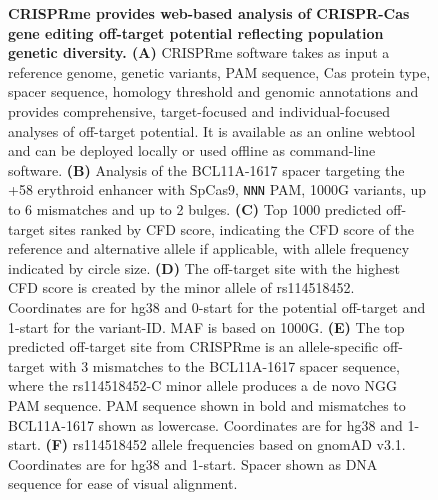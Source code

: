 \documentclass[a4paper, titlepage, openright]{book}
\begin{document}
\begin{figure}
	\caption[CRISPRme provides web-based analysis of CRISPR-Cas gene editing off-target potential reflecting population genetic diversity]{\textbf{CRISPRme provides web-based analysis of CRISPR-Cas gene editing off-target potential reflecting population genetic diversity. (A)} CRISPRme software takes as input a reference genome, genetic variants, PAM sequence, Cas protein type, spacer sequence, homology threshold and genomic annotations and provides comprehensive, target-focused and individual-focused analyses of off-target potential. It is available as an online webtool and can be deployed locally or used offline as command-line software. \textbf{(B)} Analysis of the BCL11A-1617 spacer targeting the +58 erythroid enhancer with SpCas9, \texttt{NNN} PAM, 1000G variants, up to 6 mismatches and up to 2 bulges. \textbf{(C)} Top 1000 predicted off-target sites ranked by CFD score, indicating the CFD score of the reference and alternative allele if applicable, with allele frequency indicated by circle size. \textbf{(D)} The off-target site with the highest CFD score is created by the minor allele of rs114518452. Coordinates are for hg38 and 0-start for the potential off-target and 1-start for the variant-ID. MAF is based on 1000G. \textbf{(E)} The top predicted off-target site from CRISPRme is an allele-specific off-target with 3 mismatches to the BCL11A-1617 spacer sequence, where the rs114518452-C minor allele produces a de novo NGG PAM sequence. PAM sequence shown in bold and mismatches to BCL11A-1617 shown as lowercase. Coordinates are for hg38 and 1-start. \textbf{(F)} rs114518452 allele frequencies based on gnomAD v3.1. Coordinates are for hg38 and 1-start. Spacer shown as DNA sequence for ease of visual alignment.}
	\label{fig:crisprme1}
\end{figure} 
\end{document}
